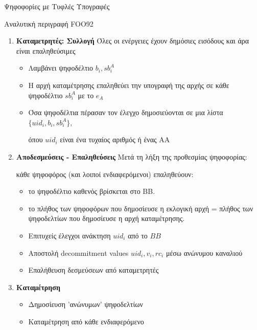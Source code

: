 \documentclass[handout]{beamer}
\begin{document}
\begin{section}{Ψηφοφορίες με Τυφλές Υπογραφές}
\begin{frame}[allowframebreaks]{Αναλυτική περιγραφή FOO92}
\begin{enumerate}
\framebreak

\item \textbf{Καταμετρητές: Συλλογή}
Όλες οι ενέργειες έχουν δημόσιες εισόδους και άρα είναι επαληθεύσιμες 
\begin{itemize}
\item Λαμβάνει ψηφοδέλτιο $b_i,sb_i^A$
\item Η αρχή καταμέτρησης επαληθεύει την υπογραφή της αρχής σε κάθε ψηφοδέλτιο $sb_i^A$ με το $e_A$
\item Όσα ψηφοδέλτια πέρασαν τον έλεγχο δημοσιεύονται σε μια λίστα $\{ uid_i, b_i, sb_i^A \}$, 

όπου $uid_i$ είναι ένα τυχαίος αριθμός ή ένας ΑΑ
\end{itemize}

\framebreak

\item \textbf{Αποδεσμεύσεις - Επαληθεύσεις}
Μετά τη λήξη της προθεσμίας ψηφοφορίας:

κάθε ψηφοφόρος (και λοιποί ενδιαφερόμενοι) επαληθεύουν:

\begin{itemize}
\item το ψηφοδέλτιο καθενός βρίσκεται στο BB.
\item το πλήθος των ψηφοφόρων που δημοσίευσε η εκλογική αρχή =  πλήθος των ψηφοδελτίων που δημοσίευσε η αρχή καταμέτρησης. 
\item Επιτυχείς έλεγχοι ανάκτηση $uid_i$ από το $BB$
\item Aποστολή decommitment values $uid_i,v_i,rc_i$ μέσω ανώνυμου καναλιού
\item Επαλήθευση δεσμεύσεων από καταμετρητές
\end{itemize}
  
\item \textbf{Καταμέτρηση}
\begin{itemize}
\item Δημοσίευση 'ανώνυμων' ψηφοδελτίων
\item Καταμέτρηση από κάθε ενδιαφερόμενο  
\end{itemize}
\end{enumerate}

\end{frame}


\end{section}
\end{document}
